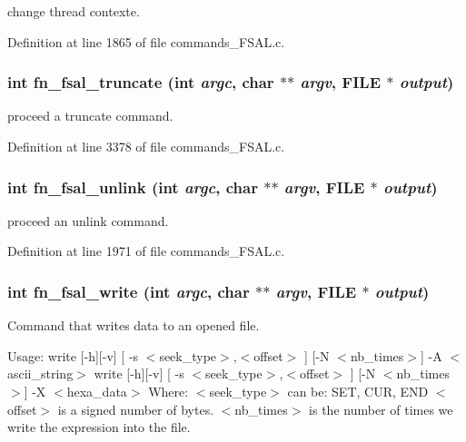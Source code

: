 change thread contexte. 

Definition at line 1865 of file commands\_\-FSAL.c.
\subsubsection[{fn\_\-fsal\_\-truncate}]{\setlength{\rightskip}{0pt plus 5cm}int fn\_\-fsal\_\-truncate (int {\em argc}, \/  char $\ast$$\ast$ {\em argv}, \/  FILE $\ast$ {\em output})}\label{commands__FSAL_8c_d1e4eaf9bc2a2c768edee9550533f8fc}


proceed a truncate command. 

Definition at line 3378 of file commands\_\-FSAL.c.
\subsubsection[{fn\_\-fsal\_\-unlink}]{\setlength{\rightskip}{0pt plus 5cm}int fn\_\-fsal\_\-unlink (int {\em argc}, \/  char $\ast$$\ast$ {\em argv}, \/  FILE $\ast$ {\em output})}\label{commands__FSAL_8c_8dbde159a7a808f5fc63ee46bfbb0aa2}


proceed an unlink command. 

Definition at line 1971 of file commands\_\-FSAL.c.
\subsubsection[{fn\_\-fsal\_\-write}]{\setlength{\rightskip}{0pt plus 5cm}int fn\_\-fsal\_\-write (int {\em argc}, \/  char $\ast$$\ast$ {\em argv}, \/  FILE $\ast$ {\em output})}\label{commands__FSAL_8c_4874930678cbb1e7a19e0bab498f5a4c}


Command that writes data to an opened file.

Usage: write [-h][-v] [ -s $<$seek\_\-type$>$,$<$offset$>$ ] [-N $<$nb\_\-times$>$] -A $<$ascii\_\-string$>$ write [-h][-v] [ -s $<$seek\_\-type$>$,$<$offset$>$ ] [-N $<$nb\_\-times$>$] -X $<$hexa\_\-data$>$ Where: $<$seek\_\-type$>$ can be: SET, CUR, END $<$offset$>$ is a signed number of bytes. $<$nb\_\-times$>$ is the number of times we write the expression into the file.

